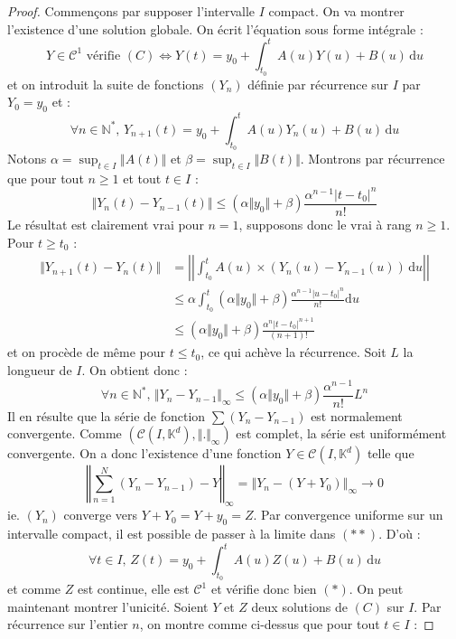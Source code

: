   \begin{proof}
    Commençons par supposer l'intervalle $I$ compact. On va montrer l'existence d'une solution globale. On écrit l'équation sous forme intégrale :
    \[ Y \in \mathcal{C}^1 \text{ vérifie } (C) \iff Y(t) = y_0 + \int_{t_0}^t A(u) Y(u) + B(u) \, \mathrm{d}u \tag{$*$} \]
    et on introduit la suite de fonctions $(Y_n)$ définie par récurrence sur $I$ par $Y_0 = y_0$ et :
    \[ \forall n \in \mathbb{N}^*, \, Y_{n+1}(t) = y_0 + \int_{t_0}^t A(u) Y_n(u) + B(u) \, \mathrm{d}u \tag{$**$} \]
    Notons $\alpha = \sup_{t \in I} \Vert A(t) \Vert$ et $\beta = \sup_{t \in I} \Vert B(t) \Vert$. Montrons par récurrence que pour tout $n \geq 1$ et tout $t \in I$ :
    \[ \Vert Y_n(t) - Y_{n-1}(t) \Vert \leq (\alpha \Vert y_0 \Vert + \beta) \frac{\alpha^{n-1} |t-t_0|^n}{n!} \]
    Le résultat est clairement vrai pour $n = 1$, supposons donc le vrai à rang $n \geq 1$. Pour $t \geq t_0$ :
    \begin{align*}
      \Vert Y_{n+1}(t) - Y_n(t) \Vert &= \left| \left| \int_{t_0}^t A(u) \times (Y_n(u) - Y_{n-1}(u)) \, \mathrm{d}u \right| \right| \\
      &\leq \alpha \int_{t_0}^t (\alpha \Vert y_0 \Vert + \beta) \frac{\alpha^{n-1} |u-t_0|^n}{n!} \mathrm{d}u \\
      &\leq (\alpha \Vert y_0 \Vert + \beta) \frac{\alpha^n |t-t_0|^{n+1}}{(n+1)!}
    \end{align*}
    et on procède de même pour $t \leq t_0$, ce qui achève la récurrence.
    \newpar
    Soit $L$ la longueur de $I$. On obtient donc :
    \[ \forall n \in \mathbb{N}^*, \, \Vert Y_n - Y_{n-1} \Vert_{\infty} \leq (\alpha \Vert y_0 \Vert + \beta) \frac{\alpha^{n-1}}{n!} L^n \]
    Il en résulte que la série de fonction $\sum (Y_n - Y_{n-1})$ est normalement convergente. Comme $(\mathcal{C} (I, \mathbb{K}^d), \Vert . \Vert_{\infty})$ est complet, la série est uniformément convergente. On a donc l'existence d'une fonction $Y \in \mathcal{C} (I, \mathbb{K}^d)$ telle que
    \[ \left \Vert \sum_{n=1}^N (Y_n - Y_{n-1}) - Y \right \Vert_\infty = \left \Vert Y_n - (Y + Y_0) \right \Vert_\infty \longrightarrow 0 \]
    ie. $(Y_n)$ converge vers $Y + Y_0 = Y + y_0 = Z$. Par convergence uniforme sur un intervalle compact, il est possible de passer à la limite dans $(**)$. D'où :
    \[ \forall t \in I, \, Z(t) = y_0 + \int_{t_0}^t A(u) Z(u) + B(u) \, \mathrm{d}u \]
    et comme $Z$ est continue, elle est $\mathcal{C}^1$ et vérifie donc bien $(*)$.
    \newpar
    On peut maintenant montrer l'unicité. Soient $Y$ et $Z$ deux solutions de $(C)$ sur $I$. Par récurrence sur l'entier $n$, on montre comme ci-dessus que pour tout $t \in I$ :

\end{proof}
